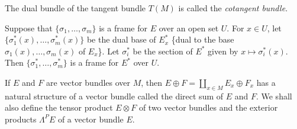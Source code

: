 The dual bundle of the tangent bundle $T(M)$ is called the {\em cotangent bundle}.

Suppose that $\{\sigma_{1},\ldots,\sigma_{m}\}$ is a frame for $E$ over an open set $U$. For $x\in U$, let $\{\sigma^{*}_{1}(x),\ldots,\sigma^{*}_{m}(x)\}$ be the dual base of $E^{*}_{x}$ \{dual to the base $\sigma_{1}(x),\ldots,\sigma_{m}(x)$ of $E_{x}$\}. Let $\sigma^{*}_{i}$ be the section of $E^{*}$ given by $x\mapsto \sigma^{*}_{i}(x)$. Then $\{\sigma^{*}_{1},\ldots,\sigma^{*}_{m}\}$ is a frame for $E^{*}$ over $U$.

If $E$ and $F$ are vector bundles over $M$, then $E\oplus F=\coprod\limits_{x\in M}E_{x}\oplus F_{x}$ has a natural structure of a vector bundle called the direct sum of $E$ and $F$. We shall also define the tensor product $E\otimes F$ of two vector bundles and the exterior products $\Lambda^{P}E$ of a vector bundle $E$.


